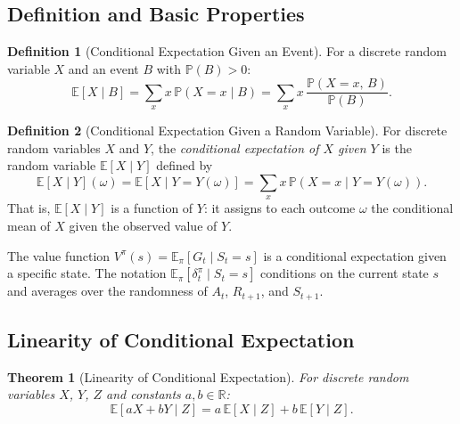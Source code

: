 \documentclass[11pt,a4paper]{article}
\theoremstyle{definition}
\newtheorem{definition}{Definition}[section]
\theoremstyle{plain}
\newtheorem{theorem}{Theorem}[section]
\theoremstyle{remark}
\newcommand{\E}{\mathbb{E}}
\newcommand{\R}{\mathbb{R}}
\newcommand{\Prob}{\mathbb{P}}
\begin{document}
\subsection{Definition and Basic Properties}
\label{subsec:cond_def}

\begin{definition}[Conditional Expectation Given an Event]
\label{def:cond_exp_event}
For a discrete random variable $X$ and an event $B$ with $\Prob(B) > 0$:
\begin{equation}
    \E[X \mid B] = \sum_x x\, \Prob(X = x \mid B) = \sum_x x\, \frac{\Prob(X = x,\, B)}{\Prob(B)}.
    \label{eq:cond_exp_event}
\end{equation}
\end{definition}

\begin{definition}[Conditional Expectation Given a Random Variable]
\label{def:cond_exp_rv}
For discrete random variables $X$ and $Y$, the \emph{conditional expectation of $X$ given $Y$} is the random variable $\E[X \mid Y]$ defined by
\begin{equation}
    \E[X \mid Y](\omega) = \E[X \mid Y = Y(\omega)] = \sum_x x\, \Prob(X = x \mid Y = Y(\omega)).
    \label{eq:cond_exp_rv}
\end{equation}
That is, $\E[X \mid Y]$ is a function of $Y$: it assigns to each outcome $\omega$ the conditional mean of $X$ given the observed value of $Y$.
\end{definition}

\begin{tdconnection}
The value function $V^\pi(s) = \E_\pi[G_t \mid S_t = s]$ is a conditional expectation given a specific state. The notation $\E_\pi[\delta_t^\pi \mid S_t = s]$ conditions on the current state $s$ and averages over the randomness of $A_t$, $R_{t+1}$, and $S_{t+1}$.
\end{tdconnection}

\subsection{Linearity of Conditional Expectation}
\label{subsec:cond_linearity}

\begin{theorem}[Linearity of Conditional Expectation]
\label{thm:cond_linearity}
For discrete random variables $X$, $Y$, $Z$ and constants $a, b \in \R$:
\begin{equation}
    \E[aX + bY \mid Z] = a\,\E[X \mid Z] + b\,\E[Y \mid Z].
    \label{eq:cond_linearity}
\end{equation}
\end{theorem}
\end{document}
